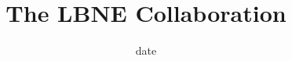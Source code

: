 \documentclass{report}
\title{The LBNE Collaboration}
\date{ {{ date }} }
\begin{document}
\renewcommand\Authfont{\small}
\renewcommand\Affilfont{\itshape}
\maketitle %
\end{document}
